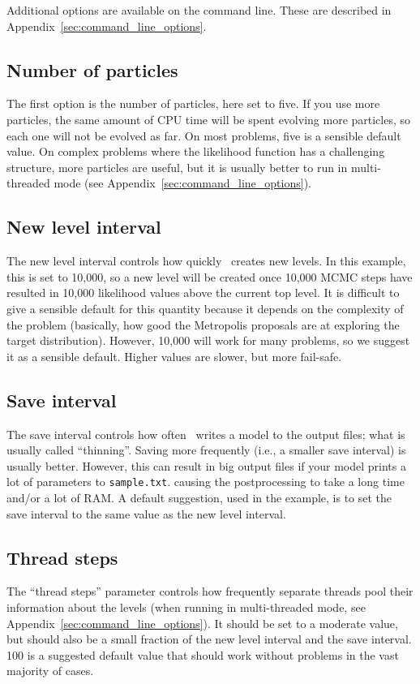 \documentclass[article, nojss]{jss}
\newcommand{\dnest}{\pkg{DNest4}}
\begin{document}
Additional options are available on the command line. These are
described in Appendix~\ref{sec:command_line_options}.

\subsection{Number of particles}
The first option is the number of particles, here set to five.
If you use more particles, the same amount of CPU time will be spent evolving more particles,
so each one will not be evolved as far. On most problems, five is a sensible
default value. On complex problems where the likelihood function has
a challenging structure, more particles are useful, but it is usually better
to run in multi-threaded mode (see Appendix~\ref{sec:command_line_options}).

\subsection{New level interval}
The new level interval controls how quickly \dnest~creates new levels. In this
example, this is set to 10,000, so a new level will be created once 10,000
MCMC steps have resulted in
10,000 likelihood values above the current top level.
It is difficult to give a sensible default for this
quantity because it depends on the complexity of the problem (basically,
how good the Metropolis proposals are at exploring the target distribution).
However, 10,000 will work for many problems, so we suggest it as a sensible
default. Higher values are slower, but more fail-safe.

\subsection{Save interval}
The save interval controls how often \dnest~writes a model to the output
files; what is usually called ``thinning''. Saving more frequently
(i.e., a smaller save interval) is usually better. However, this can result
in
big output files if your model prints a lot of parameters to {\tt sample.txt}.
causing the postprocessing to take a long time and/or a lot of RAM.
A default suggestion, used in the example, is to set the save interval to the
same value as the new level interval.

\subsection{Thread steps}
The ``thread steps'' parameter controls how frequently separate threads pool
their information about the levels (when running in multi-threaded mode,
see Appendix~\ref{sec:command_line_options}). It should be set to a moderate
value, but should also be a small fraction of the new level interval and the
save interval. 100 is a suggested default value that should work without
problems in the vast majority of cases.
\end{document}
